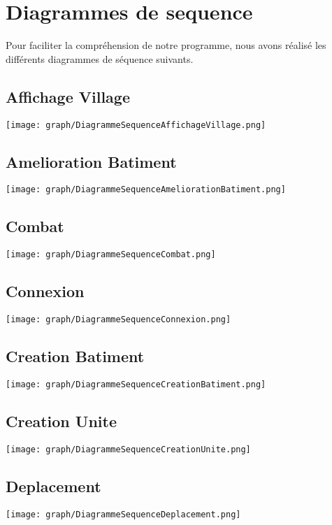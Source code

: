 \chapter{Diagrammes de sequence}
    Pour faciliter la compréhension de notre programme, nous avons réalisé les différents diagrammes de séquence suivants. 

    \section{Affichage Village}

        \texttt{[image: graph/DiagrammeSequenceAffichageVillage.png]}
        
    
    \section{Amelioration Batiment}

        \texttt{[image: graph/DiagrammeSequenceAmeliorationBatiment.png]}
        
    
    \section{Combat}

        \texttt{[image: graph/DiagrammeSequenceCombat.png]}    
    
    \section{Connexion}

        \texttt{[image: graph/DiagrammeSequenceConnexion.png]}  
        
    \section{Creation Batiment}

        \texttt{[image: graph/DiagrammeSequenceCreationBatiment.png]}  
        
   \section{Creation Unite}

        \texttt{[image: graph/DiagrammeSequenceCreationUnite.png]}    
        
   \section{Deplacement}

        \texttt{[image: graph/DiagrammeSequenceDeplacement.png]}    
        
 
